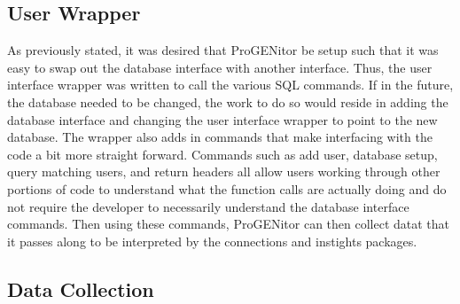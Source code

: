 \subsection{User Wrapper}
As previously stated, it was desired that ProGENitor be setup such that it was
easy to swap out the database interface with another interface.  Thus, the user
interface wrapper was written to call the various SQL commands.  If in the
future, the database needed to be changed, the work to do so would reside in
adding the database interface and changing the user interface wrapper to point
to the new database.  The wrapper also adds in commands that make interfacing
with the code a bit more straight forward.  Commands such as add user, database
setup, query matching users, and return headers all allow users working through
other portions of code to understand what the function calls are actually doing
and do not require the developer to necessarily understand the database
interface commands.  Then using these commands, ProGENitor can then collect
datat that it passes along to be interpreted by the connections and instights
packages.

\subsection{Data Collection}

